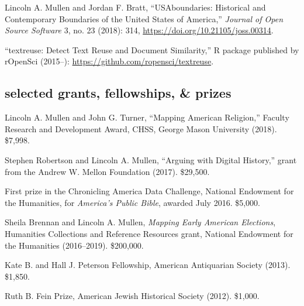 \documentclass[11pt]{article}
\begin{document}
Lincoln A. Mullen and Jordan F. Bratt, ``USAboundaries: Historical and 
Contemporary Boundaries of the United States of America,'' \emph{Journal of 
Open Source Software} 3, no. 23 (2018): 314, 
\url{https://doi.org/10.21105/joss.00314}.

``textreuse: Detect Text Reuse and Document Similarity,'' R package published 
by rOpenSci (2015--): 
\url{https://github.com/ropensci/textreuse}.

\subsection{selected grants, fellowships, \& prizes}\label{grants-and-fellowships}

Lincoln A. Mullen and John G. Turner, ``Mapping American Religion,'' Faculty 
Research and Development Award, CHSS, George Mason University (2018). \$7,998.

Stephen Robertson and Lincoln A. Mullen, ``Arguing with Digital History,'' grant 
from the Andrew W. Mellon Foundation (2017). \$29,500.

First prize in the Chronicling America Data Challenge, National Endowment 
for the Humanities, for \emph{America's Public Bible}, awarded July 2016. \$5,000.

Sheila Brennan and Lincoln A. Mullen, \emph{Mapping Early American Elections}, 
Humanities Collections and Reference Resources grant, National Endowment for 
the Humanities (2016--2019). \$200,000.

Kate B. and Hall J. Peterson Fellowship, American Antiquarian Society (2013). \$1,850.

Ruth B. Fein Prize, American Jewish Historical Society (2012). \$1,000.
\end{document}
